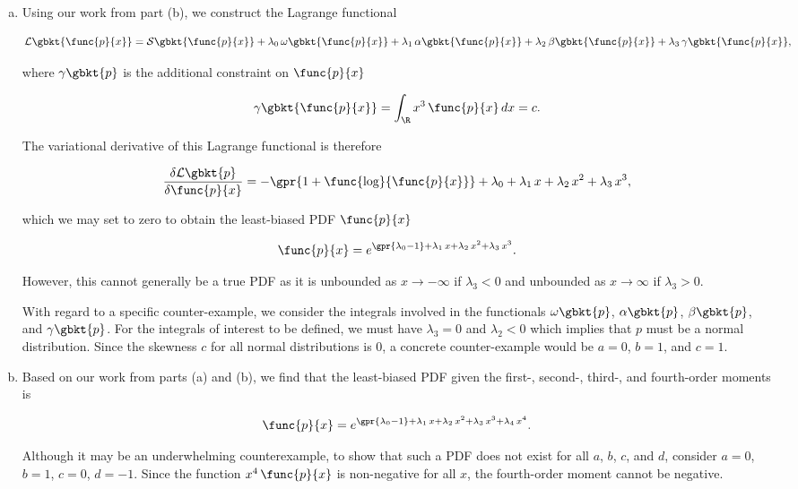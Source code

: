 \begin{enumerate}[(a)]
	\item Using our work from part (b), we construct the Lagrange functional
	
	\begin{equation}
		\mathcal{L}\gbkt{\func{p}{x}} = \mathcal{S}\gbkt{\func{p}{x}} + \lambda_0\,\omega \gbkt{\func{p}{x}} + \lambda_1\,\alpha \gbkt{\func{p}{x}} + \lambda_2\,\beta \gbkt{\func{p}{x}} + \lambda_3\,\gamma \gbkt{\func{p}{x}},
	\end{equation}
	
	where $\gamma \gbkt{p}$ is the additional constraint on $\func{p}{x}$
	
	\begin{equation}
		\gamma \gbkt{\func{p}{x}} = \int_{\R} x^3\,\func{p}{x}\,dx = c.
	\end{equation}
	
	The variational derivative of this Lagrange functional is therefore
	
	\begin{equation}
		\frac{\delta \mathcal{L}\gbkt{p}}{\delta\func{p}{x}} = -\gpr{1 + \func{\log}{\func{p}{x}}} + \lambda_0 + \lambda_1\,x + \lambda_2\,x^2 + \lambda_3\,x^3,
	\end{equation}
	
	which we may set to zero to obtain the least-biased PDF $\func{p}{x}$ 
	
	\begin{equation}
		\func{p}{x} = e^{\gpr{\lambda_0 - 1} + \lambda_1\,x + \lambda_2\,x^2 + \lambda_3\,x^3}.
	\end{equation}
	
	However, this cannot generally be a true PDF as it is unbounded as $x \to -\infty$ if $\lambda_3 < 0$ and unbounded as $x \to \infty$ if $\lambda_3 > 0$.
	
	With regard to a specific counter-example, we consider the integrals involved in the functionals $\omega \gbkt{p}$, $\alpha \gbkt{p}$, $\beta \gbkt{p}$, and $\gamma \gbkt{p}$. For the integrals of interest to be defined, we must have $\lambda_3 = 0$ and $\lambda_2 < 0$ which implies that $p$ must be a normal distribution. Since the skewness $c$ for all normal distributions is $0$, a concrete counter-example would be $a = 0$, $b = 1$, and $c = 1$.
	
	\item Based on our work from parts (a) and (b), we find that the least-biased PDF given the first-, second-, third-, and fourth-order moments is
	
	\begin{equation}
		\func{p}{x} = e^{\gpr{\lambda_0 - 1} + \lambda_1\,x + \lambda_2\,x^2 + \lambda_3\,x^3 + \lambda_4\,x^4}.
	\end{equation}
	
	Although it may be an underwhelming counterexample, to show that such a PDF does not exist for all $a$, $b$, $c$, and $d$, consider $a = 0$, $b = 1$, $c = 0$, $d = -1$. Since the function $x^4\,\func{p}{x}$ is non-negative for all $x$, the fourth-order moment cannot be negative.

\end{enumerate}

